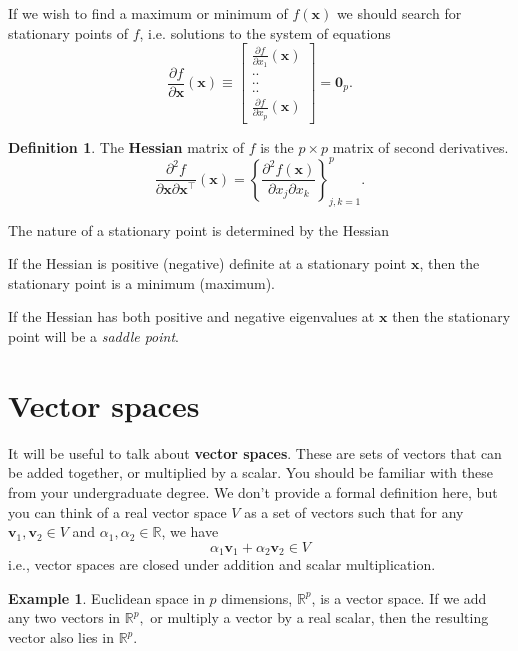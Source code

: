 \documentclass[
]{book}
\theoremstyle{definition}
\newtheorem{definition}{Definition}[chapter]
\theoremstyle{definition}
\newtheorem{example}{Example}[chapter]
\theoremstyle{definition}
\theoremstyle{definition}
\theoremstyle{remark}
\begin{document}
If we wish to find a maximum or minimum of \(f(\mathbf x)\) we should search for stationary points of \(f\), i.e.
solutions to the system of equations
\[
\frac{\partial f}{\partial \mathbf x}(\mathbf x)\equiv \left [ \begin{array}{c} \frac{\partial f}{\partial x_1}(\mathbf x)\\
 ..\\
 ..\\
 ..\\
 \frac{\partial f}{\partial x_p}(\mathbf x)
\end{array} \right ]={\mathbf 0}_p.
\]
\begin{definition}
\protect\hypertarget{def:hessian}{}{\label{def:hessian} }The \textbf{Hessian} matrix of \(f\) is the \(p \times p\) matrix of second derivatives.
\[
\frac{\partial^2f}{\partial \mathbf x\partial \mathbf x^\top}(\mathbf x) =\left \{ \frac{\partial^2 f(\mathbf x)}{\partial x_j \partial x_k}\right \}_{j,k=1}^p.
\]
\end{definition}

The nature of a stationary point is determined by the Hessian

If the Hessian is positive (negative) definite at a stationary point \(\mathbf x\), then the stationary point is a minimum (maximum).

If the Hessian has both positive and negative eigenvalues at \(\mathbf x\) then the stationary point will be a \emph{saddle point}.

\hypertarget{linalg-vecspaces}{%
\section{Vector spaces}\label{linalg-vecspaces}}

It will be useful to talk about \textbf{vector spaces}. These are sets of vectors that can be added together, or multiplied by a scalar. You should be familiar with these from your undergraduate degree. We don't provide a formal definition here, but you can think of a real vector space \(V\) as a set of vectors such that for any \(\mathbf v_1, \mathbf v_2 \in V\) and \(\alpha_1, \alpha_2 \in \mathbb{R}\), we have
\[\alpha_1 \mathbf v_1 + \alpha_2 \mathbf v_2 \in V\]
i.e., vector spaces are closed under addition and scalar multiplication.

\begin{example}
\protect\hypertarget{exm:Rp}{}{\label{exm:Rp} }Euclidean space in \(p\) dimensions, \(\mathbb{R}^p\), is a vector space. If we add any two vectors in \(\mathbb{R}^p,\) or multiply a vector by a real scalar, then the resulting vector also lies in \(\mathbb{R}^p\).
\end{example}
\end{document}
